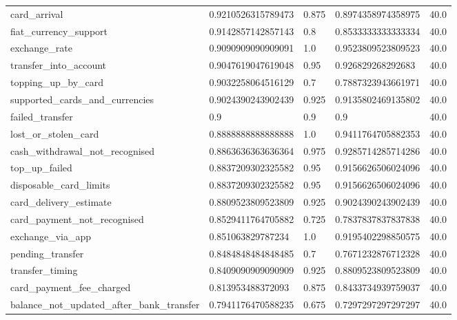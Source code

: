 \begin{table}[!ht]
\begin{tabularx}{\textwidth}{X l l l l}
card\_arrival & \num{0.9210526315789473} & \num{0.875} & \num{0.8974358974358975} & \num{40.0} \\
fiat\_currency\_support & \num{0.9142857142857143} & \num{0.8} & \num{0.8533333333333334} & \num{40.0} \\
exchange\_rate & \num{0.9090909090909091} & \num{1.0} & \num{0.9523809523809523} & \num{40.0} \\
transfer\_into\_account & \num{0.9047619047619048} & \num{0.95} & \num{0.926829268292683} & \num{40.0} \\
topping\_up\_by\_card & \num{0.9032258064516129} & \num{0.7} & \num{0.7887323943661971} & \num{40.0} \\
supported\_cards\_and\_currencies & \num{0.9024390243902439} & \num{0.925} & \num{0.9135802469135802} & \num{40.0} \\
failed\_transfer & \num{0.9} & \num{0.9} & \num{0.9} & \num{40.0} \\
lost\_or\_stolen\_card & \num{0.8888888888888888} & \num{1.0} & \num{0.9411764705882353} & \num{40.0} \\
cash\_withdrawal\_not\_recognised & \num{0.8863636363636364} & \num{0.975} & \num{0.9285714285714286} & \num{40.0} \\
top\_up\_failed & \num{0.8837209302325582} & \num{0.95} & \num{0.9156626506024096} & \num{40.0} \\
disposable\_card\_limits & \num{0.8837209302325582} & \num{0.95} & \num{0.9156626506024096} & \num{40.0} \\
card\_delivery\_estimate & \num{0.8809523809523809} & \num{0.925} & \num{0.9024390243902439} & \num{40.0} \\
card\_payment\_not\_recognised & \num{0.8529411764705882} & \num{0.725} & \num{0.7837837837837838} & \num{40.0} \\
exchange\_via\_app & \num{0.851063829787234} & \num{1.0} & \num{0.9195402298850575} & \num{40.0} \\
pending\_transfer & \num{0.8484848484848485} & \num{0.7} & \num{0.7671232876712328} & \num{40.0} \\
transfer\_timing & \num{0.8409090909090909} & \num{0.925} & \num{0.8809523809523809} & \num{40.0} \\
card\_payment\_fee\_charged & \num{0.813953488372093} & \num{0.875} & \num{0.8433734939759037} & \num{40.0} \\
balance\_not\_updated\_after\_bank\_transfer & \num{0.7941176470588235} & \num{0.675} & \num{0.7297297297297297} & \num{40.0} \\

\end{tabularx}
\end{table}
